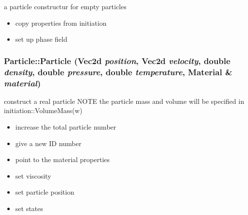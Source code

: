 a particle constructur for empty particles 



\begin{itemize}
\item copy properties from initiation\end{itemize}


\begin{itemize}
\item set up phase field \end{itemize}
\hypertarget{classParticle_5cf658952a598524638d789db59b4249}{
\subsubsection[{Particle}]{\setlength{\rightskip}{0pt plus 5cm}Particle::Particle (Vec2d {\em position}, \/  Vec2d {\em velocity}, \/  double {\em density}, \/  double {\em pressure}, \/  double {\em temperature}, \/  {\bf Material} \& {\em material})}}
\label{classParticle_5cf658952a598524638d789db59b4249}


construct a real particle NOTE the particle mass and volume will be specified in initiation::VolumeMass(w) 



\begin{itemize}
\item increase the total particle number\end{itemize}


\begin{itemize}
\item give a new ID number\end{itemize}


\begin{itemize}
\item point to the material properties\end{itemize}


\begin{itemize}
\item set viscosity\end{itemize}


\begin{itemize}
\item set particle position\end{itemize}


\begin{itemize}
\item set states\end{itemize}


